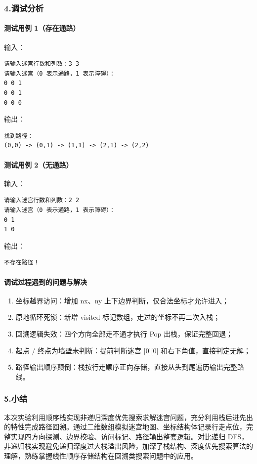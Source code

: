 \documentclass{ctexart}
\begin{document}
\subsubsection {4.调试分析}
\paragraph {测试用例 1（存在通路）}
输入：
\begin{verbatim}
请输入迷宫行数和列数：3 3
请输入迷宫（0 表示通路，1 表示障碍）：
0 0 1
0 0 1
0 0 0
\end{verbatim}
输出：
\begin{verbatim}
找到路径：
(0,0) -> (0,1) -> (1,1) -> (2,1) -> (2,2)
\end{verbatim}
\paragraph {测试用例 2（无通路）}
输入：
\begin{verbatim}
请输入迷宫行数和列数：2 2
请输入迷宫（0 表示通路，1 表示障碍）：
0 1
1 0
\end{verbatim}
输出：
\begin{verbatim}
不存在路径！
\end{verbatim}
\paragraph {调试过程遇到的问题与解决}
\begin {enumerate}
\item 坐标越界访问：增加 nx、ny 上下边界判断，仅合法坐标才允许进入；
\item 原地循环死锁：新增 visited 标记数组，走过的坐标不再二次入栈；
\item 回溯逻辑失效：四个方向全部走不通才执行 Pop 出栈，保证完整回退；
\item 起点 / 终点为墙壁未判断：提前判断迷宫 [0][0] 和右下角值，直接判定无解；
\item 路径输出顺序颠倒：栈按行走顺序正向存储，直接从头到尾遍历输出完整路线。
\end{enumerate}
\subsubsection {5.小结}
本次实验利用顺序栈实现非递归深度优先搜索求解迷宫问题，充分利用栈后进先出的特性完成路径回溯。通过二维数组模拟迷宫地图、坐标结构体记录行走点位，完整实现四方向探测、边界校验、访问标记、路径输出整套逻辑。对比递归 DFS，非递归栈实现避免递归深度过大栈溢出风险，加深了栈结构、深度优先搜索算法的理解，熟练掌握线性顺序存储结构在回溯类搜索问题中的应用。
\end{document}
